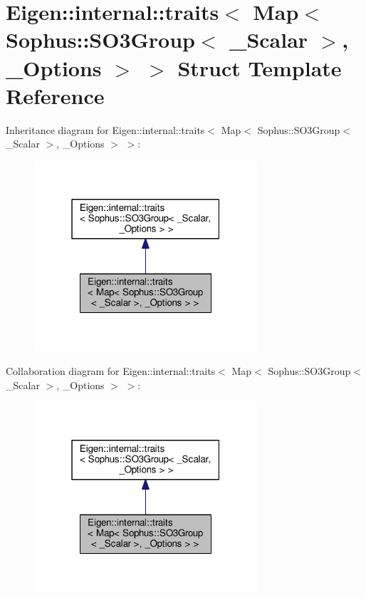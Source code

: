 \hypertarget{struct_eigen_1_1internal_1_1traits_3_01_map_3_01_sophus_1_1_s_o3_group_3_01___scalar_01_4_00_01___options_01_4_01_4}{}\section{Eigen\+:\+:internal\+:\+:traits$<$ Map$<$ Sophus\+:\+:S\+O3\+Group$<$ \+\_\+\+Scalar $>$, \+\_\+\+Options $>$ $>$ Struct Template Reference}
\label{struct_eigen_1_1internal_1_1traits_3_01_map_3_01_sophus_1_1_s_o3_group_3_01___scalar_01_4_00_01___options_01_4_01_4}


Inheritance diagram for Eigen\+:\+:internal\+:\+:traits$<$ Map$<$ Sophus\+:\+:S\+O3\+Group$<$ \+\_\+\+Scalar $>$, \+\_\+\+Options $>$ $>$\+:
\nopagebreak
\begin{figure}[H]
\begin{center}
\leavevmode
\includegraphics[width=235pt]{struct_eigen_1_1internal_1_1traits_3_01_map_3_01_sophus_1_1_s_o3_group_3_01___scalar_01_4_00_01_0329c94ee5f31c540202b49673be2390}
\end{center}
\end{figure}


Collaboration diagram for Eigen\+:\+:internal\+:\+:traits$<$ Map$<$ Sophus\+:\+:S\+O3\+Group$<$ \+\_\+\+Scalar $>$, \+\_\+\+Options $>$ $>$\+:
\nopagebreak
\begin{figure}[H]
\begin{center}
\leavevmode
\includegraphics[width=235pt]{struct_eigen_1_1internal_1_1traits_3_01_map_3_01_sophus_1_1_s_o3_group_3_01___scalar_01_4_00_01_d8eb6d87ccab4c92b994c86e08d5a55f}
\end{center}
\end{figure}

